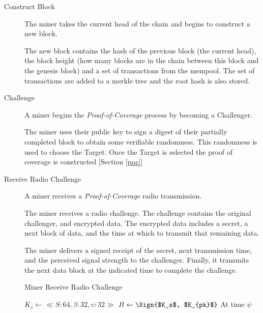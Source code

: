 \documentclass[10pt, nonatbib, nocopyrightspace, reprint]{sigplanconf}
\begin{document}
\begin{description}
  \item [Construct Block] The miner takes the current head of the chain and begins to construct a new block.

    The new block contains the hash of the previous block (the current head), the block height (how many blocks are in the chain between this block and the genesis block) and a set of transactions from the mempool. The set of transactions are added to a merkle tree and the root hash is also stored.

  \item [Challenge] A miner begins the \emph{Proof-of-Coverage} process by becoming a Challenger.

    The miner uses their public key to sign a digest of their partially completed block to obtain some verifiable randomness. This randomness is used to choose the Target. Once the Target is selected the proof of coverage is constructed [Section \ref{poc}]

  \item [Receive Radio Challenge] A miner receives a \emph{Proof-of-Coverage} radio transmission.

    The miner receives a radio challenge. The challenge contains the original challenger, and encrypted data. The encrypted data includes a secret, a next block of data, and the time at which to transmit that remaining data.

    The miner delivers a signed receipt of the secret, next transmission time, and the perceived signal strength to the challenger. Finally, it transmits the next data block at the indicated time to complete the challenge.

    \begin{algorithm}[!htb]
      \DontPrintSemicolon
      \caption{Miner Receive Radio Challenge}\label{proto:miner.recv.challenge.radio}

       {
         {
           {
            $K_s \leftarrow \ll S:64, \beta:32, \upsilon:32 \gg $\;
            $B \leftarrow \Sign{$K_s$, $E_{pk}$} $\;
            \;
            At time $\psi$ \;
          }
        }
      }
    \end{algorithm}
    \FloatBarrier


\end{description}
\end{document}
